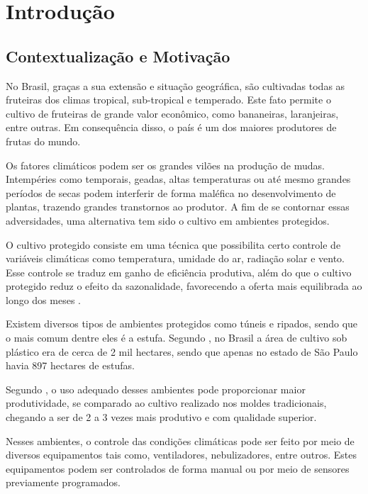 \chapter{Introdução}

\section{Contextualização e Motivação}
No Brasil, graças a sua extensão e situação geográfica, são cultivadas todas as fruteiras dos climas tropical, sub-tropical e temperado. Este fato permite o cultivo de fruteiras de grande valor econômico, como bananeiras, laranjeiras, entre outras. Em consequência disso, o país é um dos maiores produtores de frutas do mundo.

Os fatores climáticos podem ser os grandes vilões na produção de mudas. Intempéries como temporais, geadas, altas temperaturas ou até mesmo grandes períodos de secas podem interferir de forma maléfica no desenvolvimento de plantas, trazendo grandes transtornos ao produtor. A fim de se contornar essas adversidades, uma alternativa  tem sido o cultivo em ambientes protegidos.

\begin{citacao}
    O cultivo protegido consiste em uma técnica que possibilita certo controle de variáveis climáticas como temperatura, umidade do ar, radiação solar e vento. Esse controle se traduz em ganho de eficiência produtiva, além do que o cultivo protegido reduz o efeito da sazonalidade, favorecendo a oferta mais equilibrada ao longo dos meses \cite{silva2014cultivoprotegido}.	
\end{citacao}

Existem diversos tipos de ambientes protegidos como túneis e ripados, sendo que o mais comum dentre eles é a estufa. Segundo 
, no Brasil a área de cultivo sob plástico era de cerca de 2 mil hectares, sendo que apenas no estado de São Paulo havia 897 hectares de estufas. 

Segundo , o uso adequado desses ambientes pode proporcionar maior produtividade, se comparado ao cultivo realizado nos moldes tradicionais, chegando a ser de 2 a 3 vezes mais produtivo e com qualidade superior.

Nesses ambientes, o controle das condições climáticas pode ser feito por meio de diversos equipamentos tais como, ventiladores, nebulizadores, entre outros. Estes equipamentos podem ser controlados de forma manual ou por meio de sensores previamente programados.

